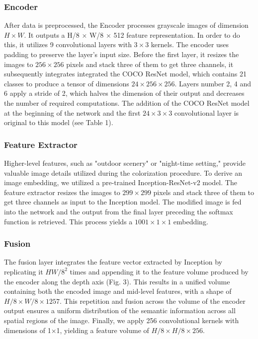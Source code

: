 \documentclass[10pt,twocolumn,letterpaper]{article}
\begin{document}
  
\subsubsection{Encoder}
After data is preprocessed, the Encoder processes grayscale images of dimension \(H \times W\). It outputs a H/8 × W/8 × 512 feature representation. In order to do this, it utilizes 9 convolutional layers with \(3 \times 3\) kernels. The encoder uses padding to preserve the layer’s input size. Before the first layer,  it resizes the images to \(256 \times 256\) pixels and stack three of them to get three channels, it subsequently integrates integrated the COCO ResNet model, which contains 21 classes to produce a tensor of dimensions \(24 \times 256 \times 256\). Layers number 2, 4 and 6 apply a stride of 2, which halves the dimension of their output and decreases the number of required computations. The addition of the COCO ResNet model at the beginning of the network and the first \(24 \times 3 \times 3\) convolutional layer is original to this model (see Table 1).

\subsubsection{Feature Extractor} 
Higher-level features, such as "outdoor scenery" or "night-time setting," provide valuable image details utilized during the colorization procedure. To derive an image embedding, we utilized a pre-trained Inception-ResNet-v2 model. The feature extractor resizes the images to \(299 \times 299\) pixels and stack three of them to get three channels as input to the Inception model. The modified image is fed into the network and the output from the final layer preceding the softmax function is retrieved. This process yields a \(1001\times1\times1\) embedding.
 

\subsubsection{Fusion}
The fusion layer integrates the feature vector extracted by Inception by replicating it \(HW/8^2\) times and appending it to the feature volume produced by the encoder along the depth axis (Fig. 3). This results in a unified volume containing both the encoded image and mid-level features, with a shape of \(H/8\times W/8\times 1257\). This repetition and fusion across the volume of the encoder output ensures a uniform distribution of the semantic information across all spatial regions of the image. Finally, we apply 256 convolutional kernels with dimensions of 1×1, yielding a feature volume of \(H/8\times H/8\times 256\).
\end{document}

